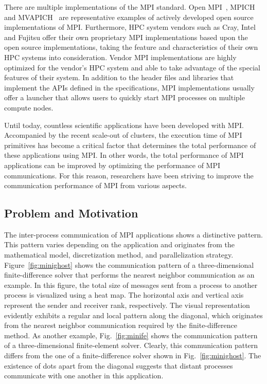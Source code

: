 There are multiple implementations of the MPI standard. Open
MPI~\cite{Squyres2005}, MPICH~\cite{Gropp2002} and MVAPICH~\cite{mvapich} are
representative examples of
actively developed open source implementations of MPI\@.
Furthermore, HPC system vendors such as Cray, Intel and Fujitsu offer their
own proprietary MPI implementations based upon the open source
implementations, taking the feature and characteristics of their own HPC
systems into consideration. Vendor MPI implementations are highly optimized
for the vendor's HPC system and able to take advantage of the special features
of their system. In addition to the header files and libraries that implement
the APIs defined in the specifications, MPI implementations usually offer a
launcher that allows users to quickly start MPI processes on multiple compute
nodes.

Until today, countless scientific applications have been developed with MPI\@.
Accompanied by the recent scale-out of clusters, the execution time of MPI
primitives has become a critical factor that determines the total performance
of these applications using MPI\@. In other words, the total performance of
MPI applications can be improved by optimizing the performance of MPI
communications. For this reason, researchers have been striving to improve the
communication performance of MPI from various aspects.

\subsection{Problem and Motivation}\label{sec:i-problem}

The inter-process communication of MPI applications shows a distinctive
pattern. This pattern varies depending on the application and originates from
the mathematical model, discretization method, and parallelization strategy.
Figure~\ref{fig:minighost} shows the communication pattern of a
three-dimensional finite-difference solver that performs the nearest neighbor
communication as an example. In this figure, the total size of messages sent
from a process to another process is visualized using a heat map. The
horizontal axis and vertical axis represent the sender and receiver rank,
respectively. The visual representation evidently exhibits a regular and local
pattern along the diagonal, which originates from the nearest neighbor
communication required by the finite-difference method. As another example,
Fig.~\ref{fig:minife} shows the communication pattern of a three-dimensional
finite-element solver. Clearly, this communication pattern differs from the
one of a finite-difference solver shown in Fig.~\ref{fig:minighost}. The
existence of dots apart from the diagonal suggests that distant processes
communicate with one another in this application.

